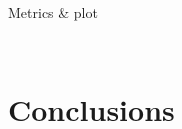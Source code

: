 \documentclass{beamer}
\renewcommand{\a}{\alpha}
\begin{document}
\begin{frame}{Metrics \& plot}
\begin{minipage}{\textwidth}
\begin{columns}
\begin{column}{0.5\textwidth}
\begin{figure}
            \end{figure}
        \end{column}
    \end{columns}
\end{minipage}


\end{frame}





\section{Conclusions}

\end{document}
